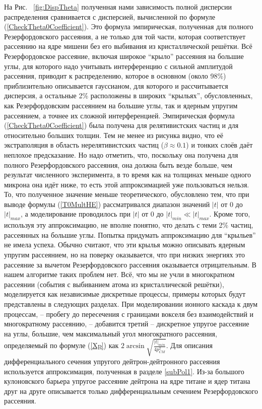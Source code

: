 \documentclass[a4paper,12pt]{article}
\begin{document}
\begin{large}
  На Рис. ~\ref{fig:DispTheta} полученная нами зависимость полной дисперсии распределения сравнивается с дисперсией, вычисленной по формуле (\ref{CheckTheta0Coefficient}). Это формула эмпирическая, полученная для полного Резерфордовского рассеяния, а не только для той части, которая соответствует рассеянию на ядре мишени без его выбивания из кристаллической решётки.
  Всё Резерфордовское рассеяние, включая широкое ``крыло'' рассеяния на большие углы, для которого надо учитывать интерференцию с сильной амплитудой рассеяния, приводит к распределению, которое в основном (около 98\%) приблизительно описывается гауссианом, для которого и рассчитывается дисперсия, а остальные 2\% расположены в широких ``крыльях'', обусловленных, как Резерфордовским рассеянием на большие углы, так и ядерным упругим рассеянием, а точнее их сложной интерференцией.
  Эмпирическая формула (\ref{CheckTheta0Coefficient}) была получена для релятивистских частиц и для относительно больших толщин.
  Тем не менее из рисунка видно, что её экстраполяция в область нерелятивистских частиц ($\beta\approx 0.1$) и тонких слоёв даёт неплохое предсказание.
  Но надо отметить, что, поскольку она получена для полного Резерфордовского рассеяния, она должна быть везде больше, чем результат численного эксперимента, в то время как на толщинах  меньше одного микрона она идёт ниже, то есть этой аппроксимацией уже пользоваться нельзя.
  То, что полученное значение меньше теоретического, обусловлено тем, что при выводе формулы (\ref{T0MultHE}) рассматривался диапазон значений $|t|$ от 0 до $|t|_{max}$, а моделирование проводилось при $|t|$ от 0 до $|t|_{min} \ll |t|_{max}$.
  Кроме того, используя эту аппроксимацию, не вполне понятно, что делать с теми 2\% частиц,  рассеянных на большие углы.
  Попытка придумать аппроксимацию для ``крыльев'' не имела успеха.
  Обычно считают, что эти крылья можно описывать ядерным упругим рассеянием, но на поверку оказывается, что при низких энергиях это рассеяние за вычетом Резерфордовского рассеяния оказывается отрицательным.
  В нашем алгоритме таких проблем нет.
  Всё, что мы не учли в многократном рассеянии (события с выбиванием атома из кристаллической решётки), моделируется как независимые дискретные процессы, примеры которых будут представлены в следующих разделах.
  При моделировании ионного каскада к двум процессам, -- пробегу до пересечения с границами вокселя без взаимодействий и многократному рассеянию, -- добавится третий -- дискретное упругое рассеяние на углы, большие, чем максимальный угол многократного рассеяния, определяемый по формуле (\ref{Xp}) как $2\arcsin{\sqrt{ \frac{|t|_{min}}{4 p_{CM}^2}} }$.
  Для описания дифференциального сечения упругого дейтрон-дейтронного рассеяния используется аппроксимация, полученная в разделе \ref{subPol1}.
  Из-за большого кулоновского барьера упругое рассеяние дейтрона на ядре титане и ядер титана друг на друге описывается только дифференциальным сечением Резерфордовского рассеяния.
 

\end{large}
\end{document}
